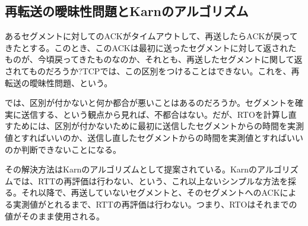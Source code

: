 \subsection{再転送の曖昧性問題とKarnのアルゴリズム}

あるセグメントに対してのACKがタイムアウトして、再送したらACKが戻ってきたとする。このとき、このACKは最初に送ったセグメントに対して返されたものが、今頃戻ってきたものなのか、それとも、再送したセグメントに関して返されてものだろうか?TCPでは、この区別をつけることはできない。これを、再転送の曖昧性問題、という。

では、区別が付かないと何か都合が悪いことはあるのだろうか。セグメントを確実に送信する、という観点から見れば、不都合はない。だが、RTOを計算し直すためには、区別が付かないために最初に送信したセグメントからの時間を実測値とすればいいのか、送信し直したセグメントからの時間を実測値とすればいいのか判断できないことになる。

その解決方法はKarnのアルゴリズムとして提案されている。Karnのアルゴリズムでは、RTTの再評価は行わない、という、これ以上ないシンプルな方法を採る。それ以降で、再送していないセグメントと、そのセグメントへのACKによる実測値がとれるまで、RTTの再評価は行わない。つまり、RTOはそれまでの値がそのまま使用される。

